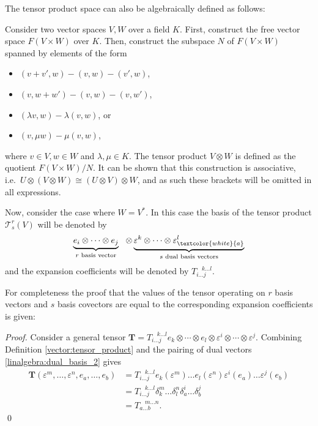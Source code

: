     The tensor product space can also be algebraically defined as follows:
    \begin{adefinition}
        Consider two vector spaces $V,W$ over a field $K$. First, construct the free vector space $F(V\times W)$ over $K$. Then, construct the subspace $N$ of $F(V\times W)$ spanned by elements of the form
        \begin{itemize}
            \item $(v+v',w) - (v,w) - (v',w)$,
            \item $(v,w+w') - (v,w) - (v,w')$,
            \item $(\lambda v,w) - \lambda(v,w)$, or
            \item $(v,\mu w) - \mu(v,w)$,
        \end{itemize}
        where $v\in V,w\in W$ and $\lambda,\mu\in K$. The tensor product $V\otimes W$ is defined as the quotient $F(V\times W)/N$. It can be shown that this construction is associative, i.e.~$U\otimes(V\otimes W)\cong(U\otimes V)\otimes W$, and as such these brackets will be omitted in all expressions.

        Now, consider the case where $W=V^*$. In this case the basis of the tensor product $\mathcal{T}^r_s(V)$ will be denoted by
        \[\underbrace{e_i\otimes\cdots\otimes e_j}_{r\text{ basis vector}}\ \ \otimes\underbrace{\varepsilon^k\otimes\cdots\otimes \varepsilon^l_{\textcolor{white}{a}}}_{s\text{ dual basis vectors}}\]
        and the expansion coefficients will be denoted by $T_{i\ldots j}^{\ \ \ \ k\ldots l}$.
    \end{adefinition}


    For completeness the proof that the values of the tensor operating on $r$ basis vectors and $s$ basis covectors are equal to the corresponding expansion coefficients is given:
    \begin{mdframed}[roundcorner=10pt, linecolor=blue, linewidth=1pt]
        \begin{proof}
            Consider a general tensor $\mathbf{T} = T_{i\ldots j}^{\ \ \ \ k\ldots l}e_k\otimes\cdots\otimes e_l\otimes\varepsilon^i\otimes\cdots\otimes\varepsilon^j$. Combining Definition \ref{vector:tensor_product} and the pairing of dual vectors \eqref{linalgebra:dual_basis_2} gives
            \begin{align*}
                \mathbf{T}(\varepsilon^m,\ldots,\varepsilon^n,e_a,\ldots,e_b) &= T_{i\ldots j}^{\ \ \ \ k\ldots l}e_k(\varepsilon^m)\ldots e_l(\varepsilon^n)\varepsilon^i(e_a)\ldots\varepsilon^j(e_b)\\
                &= T_{i\ldots j}^{\ \ \ \ k\ldots l}\delta_k^m\ldots\delta_l^n\delta_a^i\ldots\delta_b^j\\
                &= T_{a\ldots b}^{\ \ \ \ m\ldots n}.
            \end{align*}\qed
        \end{proof}
    \end{mdframed}

